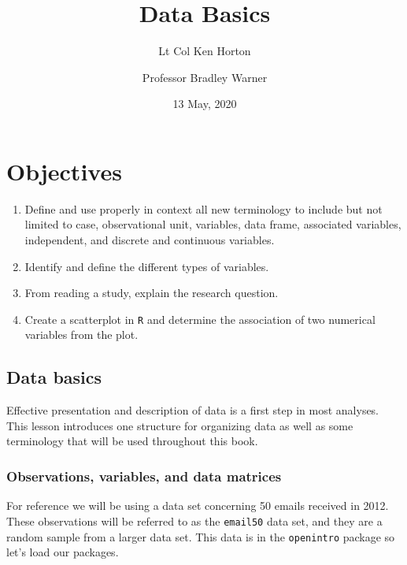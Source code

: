 \documentclass[
]{article}
\title{Data Basics}
\author{Lt Col Ken Horton \and Professor Bradley Warner}
\date{13 May, 2020}
\begin{document}
\maketitle

\newcommand{\E}{\mbox{E}}
\newcommand{\Var}{\mbox{Var}}
\newcommand{\Cov}{\mbox{Cov}}
\newcommand{\Prob}{\mbox{P}}
\newcommand*\diff{\mathop{}\!\mathrm{d}}

\hypertarget{objectives}{%
\section{Objectives}\label{objectives}}

\begin{enumerate}
\def\labelenumi{\arabic{enumi})}
\item
  Define and use properly in context all new terminology to include but
  not limited to case, observational unit, variables, data frame,
  associated variables, independent, and discrete and continuous
  variables.
\item
  Identify and define the different types of variables.
\item
  From reading a study, explain the research question.
\item
  Create a scatterplot in \texttt{R} and determine the association of
  two numerical variables from the plot.
\end{enumerate}

\hypertarget{data-basics}{%
\subsection{Data basics}\label{data-basics}}

Effective presentation and description of data is a first step in most
analyses. This lesson introduces one structure for organizing data as
well as some terminology that will be used throughout this book.

\hypertarget{observations-variables-and-data-matrices}{%
\subsubsection{Observations, variables, and data
matrices}\label{observations-variables-and-data-matrices}}

For reference we will be using a data set concerning 50 emails received
in 2012. These observations will be referred to as the \texttt{email50}
data set, and they are a random sample from a larger data set. This data
is in the \texttt{openintro} package so let's load our packages.
\end{document}
